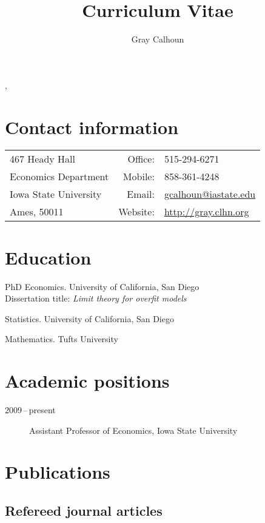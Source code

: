 \documentclass[12pt]{article}%
\author{Gray Calhoun}
\title{Curriculum Vitae}
\makeatletter
\newcommand{\allcaps}[1]{\textls{\MakeUppercase{#1}}}
\def\maketitle{%
\begin{center}%
\par{\textls{\MakeUppercase{\textbf{\@author}}}}%
\vspace{\itemsep}%
\par{\@title, \@date}%
\end{center}%
}
\makeatother
\begin{document}
\maketitle

\section*{Contact information}
\begin{tabular}{@{}lrl@{}}
 467 Heady Hall            & {Office:}  & 515-294-6271              \\
 Economics Department      & {Mobile:}  & 858-361-4248              \\
 Iowa State University     & {Email:}   & \url{gcalhoun@iastate.edu}\\
 Ames, \allcaps{IA} 50011  & {Website:} & \url{http://gray.clhn.org}
\end{tabular}

\section*{Education}

\begin{description}[noitemsep]
\item[2009] PhD Economics. University of California, San Diego \\
Dissertation title: \textit{Limit theory for overfit models}
\item[2006] \allcaps{MS} Statistics. University of California, San Diego
\item[2001] \allcaps{BA} Mathematics. Tufts University
\end{description}

\section*{Academic positions}

\begin{description}
\item[2009\,--\,present] Assistant Professor of Economics, Iowa State University
\end{description}

\section*{Publications}
\subsection*{Refereed journal articles}
\end{document}
